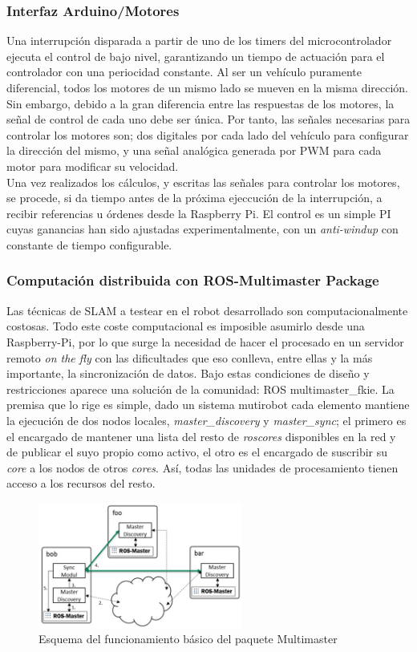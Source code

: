 \subsubsection{Interfaz Arduino/Motores}
Una interrupción disparada a partir de uno de los timers del microcontrolador ejecuta el control de bajo nivel, garantizando un tiempo de actuación para el controlador con una periocidad constante. Al ser un vehículo puramente diferencial, todos los motores de un mismo lado se mueven en la misma dirección. Sin embargo, debido a la gran diferencia entre las respuestas de los motores, la señal de control de cada uno debe ser única. Por tanto, las señales necesarias para controlar los motores son; dos digitales por cada lado del vehículo para configurar la dirección del mismo, y una señal analógica generada por PWM para cada motor para modificar su velocidad. \\
Una vez realizados los cálculos, y escritas las señales para controlar los motores, se procede, si da tiempo antes de la próxima ejeccución de la interrupción, a recibir referencias u órdenes desde la Raspberry Pi. El control es un simple PI cuyas ganancias han sido ajustadas experimentalmente, con un \textit{anti-windup} con constante de tiempo configurable.

\subsubsection{Computación distribuida con ROS-Multimaster Package}
Las técnicas de SLAM a testear en el robot desarrollado son computacionalmente costosas. Todo este coste computacional es
imposible asumirlo desde una Raspberry-Pi, por lo que surge la necesidad de hacer el procesado en un servidor remoto \textit{on the fly} con las 
dificultades que eso conlleva, entre ellas y la más importante, la sincronización de datos. Bajo estas condiciones de diseño y restricciones aparece una solución de la comunidad: ROS multimaster\_fkie. La premisa que lo rige es simple, dado un sistema mutirobot cada elemento mantiene la ejecución de dos nodos locales, \textit{master\_discovery} y \textit{master\_sync}; el primero es el encargado de mantener una lista del resto de \textit{roscores} disponibles en la red y de publicar el suyo propio como activo, el otro es el encargado de suscribir su \textit{core} a los nodos de otros \textit{cores}. Así, todas las unidades de procesamiento tienen acceso a los recursos del resto. 
\begin{figure}[!ht]
    \centering
    \includegraphics[width=0.6\textwidth]{images/ros_multimaster.png}
    \caption{Esquema del funcionamiento básico del paquete Multimaster}
\end{figure}

